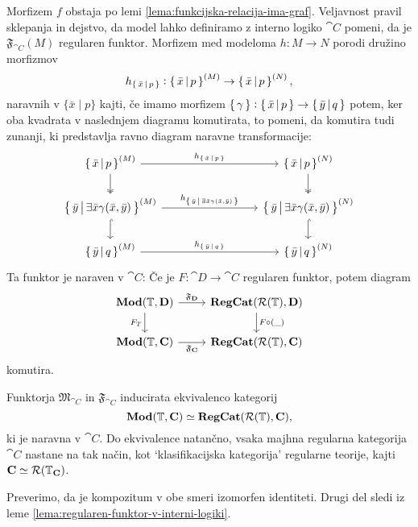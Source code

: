 \documentclass[../kategoricna_logika.tex]{subfiles}
\begin{document}
Morfizem $f$ obstaja po lemi \ref{lema:funkcijska-relacija-ima-graf}.
Veljavnost pravil sklepanja in
dejstvo, da model lahko definiramo z interno logiko $\cat{C}$ pomeni,
da je $\mathfrak{F}_{\cat{C}}(M)$ regularen funktor.  Morfizem med
modeloma $h : M \to N$ porodi družino morfizmov
$$h_{\left\lbrace\,\bar{x}\,\middle|\, p\,\right\rbrace} : \left\lbrace\,\bar{x}\,\middle|\, p\,\right\rbrace^{(M)} \to \left\lbrace\,\bar{x}\,\middle|\, p\,\right\rbrace^{(N)},$$
naravnih v $\{\bar{x} \mid p\}$ kajti, če imamo morfizem
$\left\lbrace\,\gamma\,\right\rbrace : \left\lbrace\,\bar{x}\,\middle|\, p\,\right\rbrace \to
\left\lbrace\,\bar{y}\,\middle|\, q\,\right\rbrace$ potem, ker oba kvadrata v naslednjem
diagramu komutirata, to pomeni, da komutira tudi zunanji, ki
predstavlja ravno diagram naravne transformacije:
\begin{equation*}
  \begin{tikzcd}[column sep=3cm]
    \set{\bar{x}\,\middle|\, p}^{(M)} \ar[d, two heads] \ar[r, "h_{\set{\bar{x}\,\middle|\, p}}"] & \set{\bar{x}\,\middle|\, p}^{(N)} \ar[d, two heads] \\
    \set{\bar{y}\,\middle|\, \exists \bar{x} \gamma(\bar{x}, \bar{y})}^{(M)}  \ar[d, hook] \ar[r, "h_{\set{\bar{y}\,\middle|\, \exists \bar{x} \gamma(\bar{x}, \bar{y})}}"] & \set{\bar{y}\,\middle|\, \exists \bar{x} \gamma(\bar{x}, \bar{y})}^{(N)} \ar[d, hook] \\
    \set{\bar{y}\,\middle|\, q}^{(M)} \ar[r,
    "h_{\set{\bar{y}\,\middle|\, q}}"] & \set{\bar{y}\,\middle|\,
      q}^{(N)}
  \end{tikzcd}
\end{equation*}
Ta funktor je naraven v $\cat{C}$: Če je $F : \cat{D} \to \cat{C}$
regularen funktor, potem diagram
\begin{equation}
  \begin{tikzcd}
    \Mod(\T, \cat{D}) \ar[d, "F_T"'] \ar[r, "\mathfrak{F}_{\cat{D}}"] & \cat{RegCat}(\mathcal{R}(\T), \cat{D}) \ar[d, "F \circ (\_)"] \\
    \Mod(\T, \cat{C}) \ar[r, "\mathfrak{F}_{\cat{C}}"'] &
    \cat{RegCat}(\mathcal{R}(\T), \cat{C})
  \end{tikzcd}
\end{equation}
komutira.
\begin{izrek}
  Funktorja $\mathfrak{M}_{\cat{C}}$ in $\mathfrak{F}_{\cat{C}}$
  inducirata ekvivalenco kategorij
  $$\mathbf{Mod}(\mathbb{T}, {\operatorname{\mathbf{C}}}) \simeq {\operatorname{\mathbf{RegCat}}}(\mathcal{R}(\mathbb{T}), {\operatorname{\mathbf{C}}}),$$
  ki je naravna v $\cat{C}$. Do ekvivalence natančno, vsaka majhna
  regularna kategorija $\cat{C}$ nastane na tak način, kot
  `klasifikacijska kategorija' regularne teorije, kajti
  ${\operatorname{\mathbf{C}}} \simeq \mathcal{R}(\mathbb{T}_{{\operatorname{\mathbf{C}}}})$.
\end{izrek}
\begin{dokaz}
  Preverimo, da je kompozitum v obe smeri izomorfen identiteti. Drugi
  del sledi iz leme \ref{lema:regularen-funktor-v-interni-logiki}.
\end{dokaz}
\end{document}
